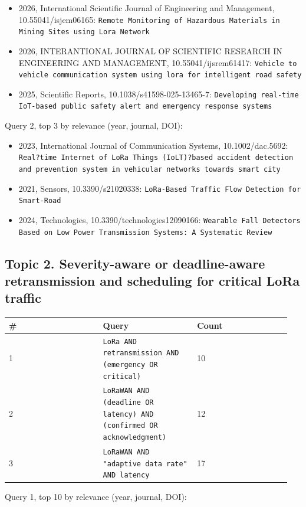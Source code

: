 \begin{itemize}
\item 2026, International Scientific Journal of Engineering and Management, 10.55041/isjem06165: \texttt{Remote Monitoring of Hazardous Materials in Mining Sites using Lora Network}
\item 2026, INTERANTIONAL JOURNAL OF SCIENTIFIC RESEARCH IN ENGINEERING AND MANAGEMENT, 10.55041/ijsrem61417: \texttt{Vehicle to vehicle communication system using lora for intelligent road safety}
\item 2025, Scientific Reports, 10.1038/s41598-025-13465-7: \texttt{Developing real-time IoT-based public safety alert and emergency response systems}
\end{itemize}

Query 2, top 3 by relevance (year, journal, DOI):

\begin{itemize}
\item 2023, International Journal of Communication Systems, 10.1002/dac.5692: \texttt{Real?time Internet of LoRa Things (IoLT)?based accident detection and prevention system in vehicular networks towards smart city}
\item 2021, Sensors, 10.3390/s21020338: \texttt{LoRa-Based Traffic Flow Detection for Smart-Road}
\item 2024, Technologies, 10.3390/technologies12090166: \texttt{Wearable Fall Detectors Based on Low Power Transmission Systems: A Systematic Review}
\end{itemize}

\subsection*{Topic 2. Severity-aware or deadline-aware retransmission and scheduling for critical LoRa traffic}

{\scriptsize\raggedright
\begin{longtable}{p{0.317\linewidth}p{0.317\linewidth}p{0.317\linewidth}}
\toprule
\# & Query & Count \\
\midrule
\endhead
1 & \texttt{LoRa AND retransmission AND (emergency OR critical)} & 10 \\
2 & \texttt{LoRaWAN AND (deadline OR latency) AND (confirmed OR acknowledgment)} & 12 \\
3 & \texttt{LoRaWAN AND "adaptive data rate" AND latency} & 17 \\
\bottomrule
\end{longtable}}

Query 1, top 10 by relevance (year, journal, DOI):

